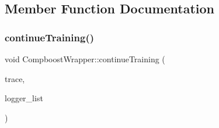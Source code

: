 \subsection{Member Function Documentation}
\mbox{\label{class_compboost_wrapper_afd9b7f389a02a13c72a7e9a834594c73}} 
\subsubsection{\texorpdfstring{continue\+Training()}{continueTraining()}}
{\footnotesize\ttfamily void Compboost\+Wrapper\+::continue\+Training (\begin{DoxyParamCaption}\item[{bool}]{trace,  }\item[{\mbox{\hyperlink{class_logger_list_wrapper}{Logger\+List\+Wrapper}} \&}]{logger\+\_\+list }\end{DoxyParamCaption})\hspace{0.3cm}{\ttfamily [inline]}}

